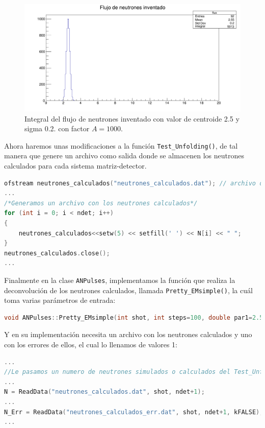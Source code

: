 \documentclass[11pt,letterpaper]{article}
\begin{document}
\begin{figure}[H]
\centering
    \includegraphics[width=1\textwidth]{img/c1_integral_con_factor.png}
    \caption{Integral del flujo de neutrones inventado con valor de centroide 2.5 y sigma 0.2. con factor $A=1000.$}
    \label{flujo_inventado_con_factor}
\end{figure}

Ahora haremos unas modificaciones a la función \verb|Test_Unfolding()|, de tal manera que genere un archivo como salida donde se almacenen los neutrones calculados para cada sistema matriz-detector.


\begin{lstlisting}[language=C++]
ofstream neutrones_calculados("neutrones_calculados.dat"); // archivo de salida
...
/*Generamos un archivo con los neutrones calculados*/
for (int i = 0; i < ndet; i++) 
{
	neutrones_calculados<<setw(5) << setfill(' ') << N[i] << " ";
}
neutrones_calculados.close();
...
\end{lstlisting}

Finalmente en la clase \verb|ANPulses|, implementamos la función que realiza la deconvolución de los neutrones calculados, llamada \verb|Pretty_EMsimple()|, la cuál toma varias parámetros de entrada:

\begin{lstlisting}[language=C++]
void ANPulses::Pretty_EMsimple(int shot, int steps=100, double par1=2.5, double par2=0.02, TString Type="Dif", int rebin=1, int bin_l=12)
\end{lstlisting}

Y en su implementación necesita un archivo con los neutrones calculados y uno con los errores de ellos, el cual lo llenamos de valores 1:

\begin{lstlisting}[language=C++]
...
//Le pasamos un numero de neutrones simulados o calculados del Test_Unfolding()
...
N = ReadData("neutrones_calculados.dat", shot, ndet+1); 
...
N_Err = ReadData("neutrones_calculados_err.dat", shot, ndet+1, kFALSE);
...
\end{lstlisting}
\end{document}

